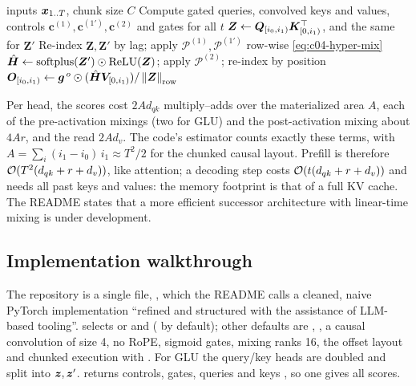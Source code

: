 \begin{algorithm}[t]
\caption{HyperGLU head, chunked prefill (following \texttt{\_forward\_chunked})}\label{alg:c04-hyper}
\begin{algorithmic}[1]
\Require inputs $\bm{x}_{1..T}$, chunk size $C$
\State Compute gated queries, convolved keys and values, controls $\bm{c}^{(1)},\bm{c}^{(1')},\bm{c}^{(2)}$ and gates for all $t$
\For{each chunk of rows $[i_0,i_1)$}
  \State $\bm{Z}\gets\bm{Q}_{[i_0,i_1)}\bm{K}_{[0,i_1)}^{\top}$, and the same for $\bm{Z}'$ 
  \State Re-index $\bm{Z},\bm{Z}'$ by lag; apply $\mathcal{P}^{(1)},\mathcal{P}^{(1')}$ row-wise \eqref{eq:c04-hyper-mix}
  \State $\hat{\bm H}\gets\mathrm{softplus}(\bm{Z}')\odot\operatorname{ReLU}(\bm{Z})$; apply $\mathcal{P}^{(2)}$; re-index by position
  \State $\bm{O}_{[i_0,i_1)}\gets\bm{g}^{\,o}\odot(\hat{\bm H}\bm{V}_{[0,i_1)})/\left\lVert \bm{Z}\right\rVert_{\text{row}}$
\EndFor
\end{algorithmic}
\end{algorithm}

Per head, the scores cost $2Ad_{qk}$ multiply--adds over the materialized area $A$, each of the
pre-activation mixings (two for GLU) and the post-activation mixing about $4Ar$, and the read
$2Ad_v$. The code's estimator  counts exactly these terms, with
$A=\sum_i(i_1-i_0)\,i_1\approx T^2/2$ for the chunked causal layout. Prefill is therefore
$\mathcal{O}(T^2(d_{qk}+r+d_v))$, like attention; a decoding step costs $\mathcal{O}(t(d_{qk}+r+d_v))$ and needs
all past keys and values: the memory footprint is that of a full KV cache. The README states that
a more efficient successor architecture with linear-time mixing is under development.

\subsection{Implementation walkthrough}

\begin{implnote}[title={In the code: configuration and module}]
The repository  is a single file,
, which the README calls a cleaned, naive PyTorch
implementation ``refined and structured with the assistance of LLM-based tooling''.
 selects  or  and 
( by default); other defaults are ,
, a causal convolution of size 4, no RoPE, sigmoid gates, mixing ranks 16,
the offset layout and chunked execution with . For GLU the query/key heads are
doubled and split into $\bm{z},\bm{z}'$.  returns controls, gates, queries
 and keys , so one  gives all
scores.
\end{implnote}

